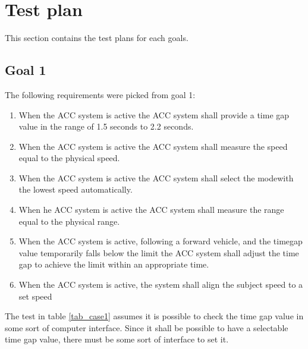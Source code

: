 \section{Test plan}
This section contains the test plans for each goals. 

\subsection{Goal 1}

The following requirements were picked from goal 1:

\begin{enumerate}
    \item When the ACC system is active the ACC system shall provide a time gap value in the range of 1.5 seconds to 2.2 seconds.
    \item When the ACC system is active the ACC system shall measure the speed equal to the physical speed.
    \item When the ACC system is active the ACC system shall select the modewith the lowest speed automatically.
    \item When he ACC system is active the ACC system shall measure the range equal to the physical range.
    \item When the ACC system is active, following a forward vehicle, and the timegap value temporarily falls below the limit the ACC system shall adjust the time gap to achieve the limit within an appropriate time.
    \item When the ACC system is active, the system shall align the subject speed to a set speed

\end{enumerate}

\noindent The test in table \ref{tab_case1} assumes it is possible to check the time gap value in some sort of computer interface. Since it shall be possible to have a selectable time gap value, there must be some sort of interface to set it. 
 
